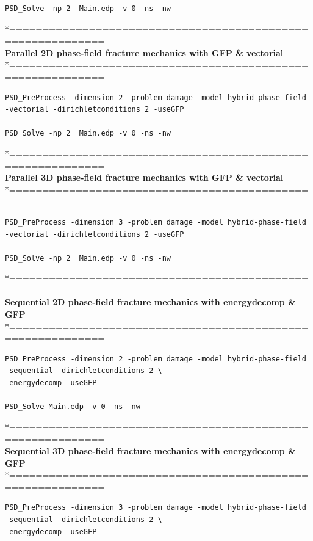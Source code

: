 {{\begin{lstlisting}[style=BashInputStyle]
PSD_Solve -np 2  Main.edp -v 0 -ns -nw   
\end{lstlisting}
*============================================================\\
\textbf{ Parallel 2D phase-field fracture mechanics with GFP \& vectorial} \\
*============================================================\\
\begin{lstlisting}[style=BashInputStyle]
PSD_PreProcess -dimension 2 -problem damage -model hybrid-phase-field -vectorial -dirichletconditions 2 -useGFP   

PSD_Solve -np 2  Main.edp -v 0 -ns -nw   
\end{lstlisting}
*============================================================\\
\textbf{ Parallel 3D phase-field fracture mechanics with GFP \& vectorial }\\
*============================================================\\
\begin{lstlisting}[style=BashInputStyle]
PSD_PreProcess -dimension 3 -problem damage -model hybrid-phase-field -vectorial -dirichletconditions 2 -useGFP   

PSD_Solve -np 2  Main.edp -v 0 -ns -nw   
\end{lstlisting}
*============================================================\\
 \textbf{Sequential 2D phase-field fracture mechanics with energydecomp \& GFP} \\
*============================================================\\
\begin{lstlisting}[style=BashInputStyle]
PSD_PreProcess -dimension 2 -problem damage -model hybrid-phase-field -sequential -dirichletconditions 2 \
-energydecomp -useGFP   

PSD_Solve Main.edp -v 0 -ns -nw   
\end{lstlisting}
*============================================================\\
\textbf{ Sequential 3D phase-field fracture mechanics with energydecomp \& GFP} \\
*============================================================\\
\begin{lstlisting}[style=BashInputStyle]
PSD_PreProcess -dimension 3 -problem damage -model hybrid-phase-field -sequential -dirichletconditions 2 \
-energydecomp -useGFP   


\end{lstlisting}}}
